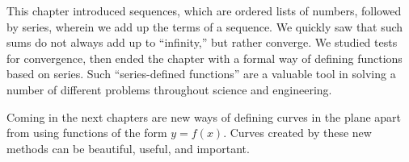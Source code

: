 This chapter introduced sequences, which are ordered lists of numbers, followed by series, wherein we add up the terms of a sequence. We quickly saw that such sums do not always add up to ``infinity,'' but rather converge. We studied tests for convergence, then ended the chapter with a formal way of defining functions based on series. Such ``series-defined functions'' are a valuable tool in solving a number of different problems throughout science and engineering.

Coming in the next chapters are new ways of defining curves in the plane apart from using functions of the form $y=f(x)$. Curves created by these new methods can be beautiful, useful, and important. 


